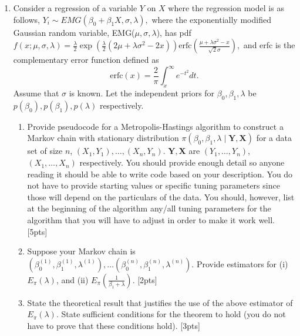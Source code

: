 \documentclass[12pt]{article}
\begin{document}
\begin{enumerate}
\item Consider a regression of a variable $Y$ on $X$ where the regression model is as follows,
$Y_i \sim EMG(\beta_0 + \beta_1X, \sigma, \lambda),$ 
where the exponentially modified Gaussian random variable, EMG($\mu, \sigma, \lambda$), has pdf
$f(x;\mu, \sigma, \lambda) = \frac{\lambda}{2} \exp(\frac{\lambda}{2} (2\mu + \lambda\sigma^2 - 2x)) \mbox{erfc}\left(\frac{\mu + \lambda\sigma^2 - x}{\sqrt{2} \sigma} \right), $
and erfc is the complementary error function defined as
$$\mbox{erfc}(x) = \frac{2}{\pi} \int_x^{\infty} e^{-t^2} dt.$$
Assume that $\sigma$ is known. Let the independent priors for
$\beta_0, \beta_1, \lambda$ be $p(\beta_0), p(\beta_1), p(\lambda)$
respectively.
\begin{enumerate}
\item Provide pseudocode for a Metropolis-Hastings algorithm to
  construct a Markov chain with stationary distribution $\pi(\beta_0,
  \beta_1, \lambda\mid {\mathbf Y}, {\mathbf X})$ for a data set of size $n$,
  $(X_1,Y_1),\dots, (X_n,Y_n)$.  ${\mathbf Y}, {\mathbf X}$ are
 $(Y_1,\dots, Y_n)$, $(X_1,\dots, X_n)$ respectively. You should provide enough detail so
  anyone reading it should be able to write code based on your
  description. You do not have to provide starting values or specific
  tuning parameters since those will depend on the particulars of the
  data. You should, however, list at the beginning of the algorithm
  any/all tuning parameters for the algorithm that you will have to
  adjust in order to make it work well. [5pts]
\item Suppose your Markov chain is $(\beta_0 ^{(1)}, \beta_1 ^{(1)}, \lambda ^{(1)}) ,\dots
 (\beta_0^{(n)}, \beta_1 ^{(n)}, \lambda ^{(n)})$. Provide estimators for (i)
 $E_{\pi}(\lambda)$, and (ii)
  $E_{\pi}\left(\frac{1}{\beta_1 + \lambda}\right)$. [2pts]
\item State the theoretical result that justifies the use of the above
  estimator of $E_{\pi}(\lambda)$. State sufficient conditions for the theorem
  to hold (you do not have to prove that these conditions hold). [3pts]

\end{enumerate}
\end{enumerate}
\end{document}
